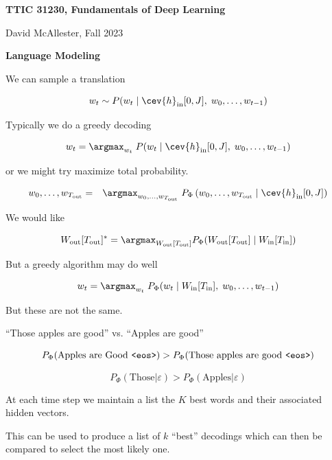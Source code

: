 




{\Huge

  \centerline{\bf TTIC 31230, Fundamentals of Deep Learning}
  \bigskip
  \centerline{David McAllester, Fall 2023}
  \vfill
  \centerline{\bf Language Modeling}


We can sample a translation

$$w_t \sim P(w_t\;|\;\cev{h}_{\mathrm{in}}[0,J],\;w_0,\ldots,w_{t-1})$$

\vfill
Typically we do a greedy decoding

$$w_t = \argmax_{w_t}\; P(w_t\;|\;\cev{h}_{\mathrm{in}}[0,J],\;w_0,\ldots,w_{t-1})$$

\vfill
or we might try maximize total probability.

\begin{eqnarray*}
w_0,\ldots,w_{T_{\mathrm{out}}}
& = & \argmax_{w_0,\ldots,w_{T_{\mathrm{out}}}} \;P_\Phi\left(w_0,\ldots,w_{T_{\mathrm{out}}} \;|\; \cev{h}_{\mathrm{in}}[0,J]\right)
\end{eqnarray*}


We would like

\vfill
$$W_{\mathrm{out}}[T_{\mathrm{out}}]^* = \argmax_{W_{\mathrm{out}}[T_{\mathrm{out}}]}
P_\Phi(W_{\mathrm{out}}[T_{\mathrm{out}}] \;|\;W_{\mathrm{in}}[T_{\mathrm{in}}])$$

\vfill
But a greedy algorithm may do well

\vfill
$$w_t = \argmax_{w_t}\; P_\Phi(w_t\;|\;W_{\mathrm{in}}[T_{\mathrm{in}}],\;w_0,\ldots,w_{t-1})$$

\vfill
But these are not the same.


``Those apples are good'' vs. ``Apples are good''

\vfill
$$P_\Phi(\mbox{Apples are Good {\tt <eos>}}) > P_\Phi(\mbox{Those apples are good {\tt <eos>}})$$

\vfill
$$P_\Phi(\mbox{Those}|\varepsilon) > P_\Phi(\mbox{Apples}|\varepsilon)$$
    

At each time step we maintain a list the $K$ best words and their associated hidden vectors.

\vfill
This can be used to produce a list of $k$ ``best'' decodings which can then be compared to select
the most likely one.

}


